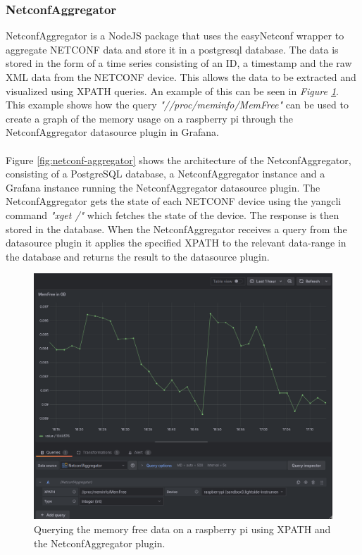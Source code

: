 \documentclass[12pt]{article}
\begin{document}
\subsubsection{NetconfAggregator}
NetconfAggregator is a NodeJS package that uses the easyNetconf wrapper 
\cite{heimonenSlenderman00Netconfaggregator2025} to aggregate NETCONF data and store 
it in a postgresql database. The data is stored in the form of a time series consisting of an ID, a timestamp and the 
raw XML data from the NETCONF device. This allows the data to be extracted and visualized using XPATH queries.
An example of this can be seen in \textit{Figure \ref{fig:netconf-aggregator-memfree}}.
This example shows how the query \textit{"//proc/meminfo/MemFree"} can be used to create a graph of the memory usage 
on a raspberry pi through the NetconfAggregator datasource plugin in Grafana.
\\
\\
Figure \ref{fig:netconf-aggregator} shows the architecture of the NetconfAggregator, consisting
of a PostgreSQL database, a NetconfAggregator instance and a Grafana instance running the NetconfAggregator datasource plugin.
The NetconfAggregator gets the state of each NETCONF device using the yangcli command \textit{"xget /"} which
fetches the state of the device. The response is then stored in the database.
When the NetconfAggregator receives a query from the datasource plugin it applies the specified XPATH to 
the relevant data-range in the database and returns the result to the datasource plugin.

\begin{figure}
  \centering
  \includegraphics[width=\textwidth]{memfree.png}
  \caption{Querying the memory free data on a raspberry pi using XPATH and the NetconfAggregator plugin.}
  \label{fig:netconf-aggregator-memfree}
\end{figure}
\end{document}
